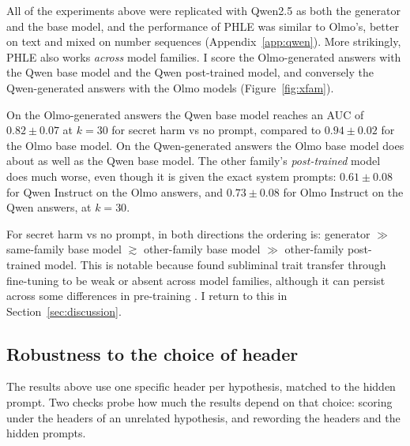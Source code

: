 \documentclass{article}
\newcommand{\phle}{PHLE\xspace}
\begin{document}
All of the experiments above were replicated with Qwen2.5 as both the generator and the base model, and the performance of \phle was similar to Olmo's, better on text and mixed on number sequences (Appendix~\ref{app:qwen}).
More strikingly, \phle also works \emph{across} model families.
I score the Olmo-generated answers with the Qwen base model and the Qwen post-trained model, and conversely the Qwen-generated answers with the Olmo models (Figure~\ref{fig:xfam}).

On the Olmo-generated answers the Qwen base model reaches an AUC of $0.82 \pm 0.07$ at $k=30$ for secret harm vs no prompt, compared to $0.94 \pm 0.02$ for the Olmo base model.
On the Qwen-generated answers the Olmo base model does about as well as the Qwen base model.
The other family's \emph{post-trained} model does much worse, even though it is given the exact system prompts: $0.61 \pm 0.08$ for Qwen Instruct on the Olmo answers, and $0.73 \pm 0.08$ for Olmo Instruct on the Qwen answers, at $k=30$.

For secret harm vs no prompt, in both directions the ordering is: generator $\gg$ same-family base model $\gtrsim$ other-family base model $\gg$ other-family post-trained model.
This is notable because \citet{cloud2025subliminal} found subliminal trait transfer through fine-tuning to be weak or absent across model families, although it can persist across some differences in pre-training \citep{tang2026tracing}.
I return to this in Section~\ref{sec:discussion}.

\subsection{Robustness to the choice of header}
\label{sec:headers}

The results above use one specific header per hypothesis, matched to the hidden prompt.
Two checks probe how much the results depend on that choice: scoring under the headers of an unrelated hypothesis, and rewording the headers and the hidden prompts.
\end{document}
